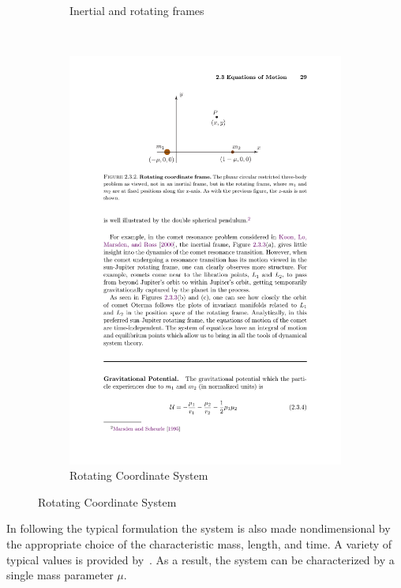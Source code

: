 \begin{figure}[htbp]
\begin{subfigure}[H]{0.5\columnwidth}
                \caption{Inertial and rotating frames}%
                \label{fig:rot_frame}%
        \end{subfigure}%
        ~
        \begin{subfigure}[H]{0.5\columnwidth}%
                \includegraphics[width=\textwidth]{figures/2015_SSPI/rot_frame_def}%
                \caption{Rotating Coordinate System}%
                \label{fig:rot_frame_def}%
        \end{subfigure}%
		\label{fig:ref_frame}%
\end{figure}%
In following the typical formulation the system is also made nondimensional by the appropriate choice of the characteristic mass, length, and time.
A variety of typical values is provided by~\cite{koon2000}.
As a result, the system can be characterized by a single mass parameter \( \mu \).
